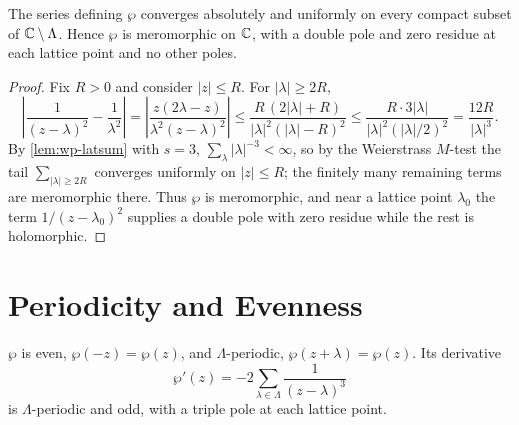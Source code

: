 \begin{proposition}
\label{prop:wp-converges}
The series defining \(\wp\) converges absolutely and uniformly on every compact
subset of \(\mathbb{C} \setminus \Lambda\). Hence \(\wp\) is meromorphic on \(\mathbb{C}\), with a
double pole and zero residue at each lattice point and no other poles.
\end{proposition}

\begin{proof}
Fix \(R > 0\) and consider \(|z| \le R\). For \(|\lambda| \ge 2R\),
\[
  \left| \frac{1}{(z-\lambda)^2} - \frac{1}{\lambda^2} \right|
  = \left| \frac{z(2\lambda - z)}{\lambda^2 (z-\lambda)^2} \right|
  \le \frac{R\,(2|\lambda| + R)}{|\lambda|^2 (|\lambda| - R)^2}
  \le \frac{R \cdot 3|\lambda|}{|\lambda|^2 (|\lambda|/2)^2}
  = \frac{12 R}{|\lambda|^3}.
\]
By \cref{lem:wp-latsum} with \(s = 3\), \(\sum_\lambda |\lambda|^{-3} < \infty\),
so by the Weierstrass \(M\)-test the tail \(\sum_{|\lambda| \ge 2R}\) converges
uniformly on \(|z| \le R\); the finitely many remaining terms are meromorphic
there. Thus \(\wp\) is meromorphic, and near a lattice point \(\lambda_0\) the
term \(1/(z-\lambda_0)^2\) supplies a double pole with zero residue while the rest
is holomorphic.
\end{proof}

\section{Periodicity and Evenness}
\label{sec:wp-periodic}

\begin{proposition}
\label{prop:wp-even-periodic}
\(\wp\) is even, \(\wp(-z) = \wp(z)\), and \(\Lambda\)-periodic,
\(\wp(z+\lambda) = \wp(z)\). Its derivative
\[
  \wp'(z) = -2 \sum_{\lambda \in \Lambda} \frac{1}{(z-\lambda)^3}
\]
is \(\Lambda\)-periodic and odd, with a triple pole at each lattice point.
\end{proposition}

